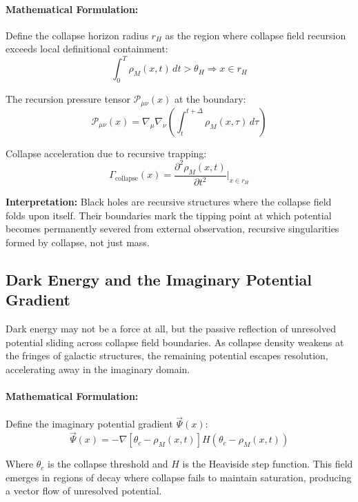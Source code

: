 \paragraph{Mathematical Formulation:}
Define the collapse horizon radius $r_H$ as the region where collapse field recursion exceeds local definitional containment:
\begin{equation}
\int_0^T \rho_M(x, t) \, dt > \theta_H \Rightarrow x \in r_H
\end{equation}

The recursion pressure tensor $\mathcal{P}_{\mu\nu}(x)$ at the boundary:
\begin{equation}
\mathcal{P}_{\mu\nu}(x) = \nabla_\mu \nabla_\nu \left( \int_{t}^{t+\Delta} \rho_M(x, \tau) \, d\tau \right)
\end{equation}

Collapse acceleration due to recursive trapping:
\begin{equation}
\Gamma_{\text{collapse}}(x) = \frac{\partial^2 \rho_M(x,t)}{\partial t^2} \Big|_{x \in r_H}
\end{equation}

\textbf{Interpretation:} Black holes are recursive structures where the collapse field folds upon itself. Their boundaries mark the tipping point at which potential becomes permanently severed from external observation, recursive singularities formed by collapse, not just mass.

\subsection{Dark Energy and the Imaginary Potential Gradient}\cite{cmb_anomaly_analysis}
Dark energy may not be a force at all, but the passive reflection of unresolved potential sliding across collapse field boundaries. As collapse density weakens at the fringes of galactic structures, the remaining potential escapes resolution, accelerating away in the imaginary domain.

\paragraph{Mathematical Formulation:}
Define the imaginary potential gradient $\vec{\Psi}(x)$:
\begin{equation}
\vec{\Psi}(x) = -\nabla \left[ \theta_c - \rho_M(x,t) \right] H(\theta_c - \rho_M(x,t))
\end{equation}

Where $\theta_c$ is the collapse threshold and $H$ is the Heaviside step function. This field emerges in regions of decay where collapse fails to maintain saturation, producing a vector flow of unresolved potential.

